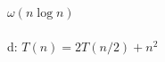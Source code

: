 \documentclass{article}
\begin{document}
                                                                                                                                                                                                                                                                                                                                                                                                                                                                                                                                                                                                                                                                                                                                                                                                                                        $\omega(n\log{n})$\\
                                                                                                                                                                                                                                                                                                                                                                                                                                                                                                                                                                                                                                                                                                                                                                                                                                                \\
                                                                                                                                                                                                                                                                                                                                                                                                                                                                                                                                                                                                                                                                                                                                                                                                                                                        d: $T(n) = 2T(n/2) + n^2$\\
\end{document}
